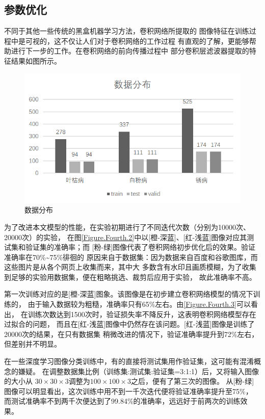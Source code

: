 \setcounter{table}{0}
\setcounter{figure}{0}

\subsection{\hei\xiaosan\textbf{参数优化}}

  不同于其他一些传统的黑盒机器学习方法，卷积网络所提取的
  图像特征在训练过程中是可视的，这不仅让人们对于卷积网络的工作过程
  有直观的了解，更能够帮助进行下一步的工作。在卷积网络的前向传播过程中
  部分卷积层滤波器提取的特征结果如图所示。

  \begin{figure}[H]
    \centering
    \includegraphics[width=.5\textwidth]{resource/数据分布.bmp}
    \caption{数据分布}
    \label{Figure.Fourth.1}
  \end{figure}

  为了改进本文模型的性能，在实验初期进行了不同迭代次数（分别为10000次、20000次）的实验，
  在图\ref{Figure.Fourth.2}中以[橙-深蓝]、[红-浅蓝]图像对应其测试集和验证集的准确率；而
  [粉-绿]图像代表了卷积网络初步优化后的效果。验证准确率在70\%\textasciitilde75\%徘徊的
  原因来自于数据集：因为数据来自百度和谷歌图库，而这些图片是从各个网页上收集而来，其中大
  多数含有水印且画质模糊，为了收集到足够的实验用数据集，便在粗略挑选、裁剪后应用于实验，
  故此准确率不高。

  第一次训练对应的是[橙-深蓝]图象。该图像是在初步建立卷积网络模型的情况下训练的，
  由于输入数据较为粗糙，准确率只有65\%左右。由\ref{Figure.Fourth.3}可以看出，
  在训练次数达到1500次时，验证损失率不降反升，这表明卷积网络模型存在过拟合的问题，
  而且在[红-浅蓝]图像中仍然存在该问题。[红-浅蓝]图像是训练了20000次的结果，在只有数据集
  稍微改进的情况下，验证准确率提升到72\%左右，但差别并不明显。

  在一些深度学习图像分类训练中，有的直接将测试集用作验证集，这可能有混淆概念的嫌疑。
  在调整数据集比例（训练集:测试集:验证集=3:1:1）后，又将输入图像的大小从
  $30\times30\times3$调整为$100\times100\times3$之后，便有了第三次的图像。
  从[粉-绿]图像可以明显看出，这次训练中用不到一千次迭代便将验证准确率提升至75\%，
  而测试准确率不到两千次便达到了99.84\%的准确率，远远好于前两次的训练效果。


